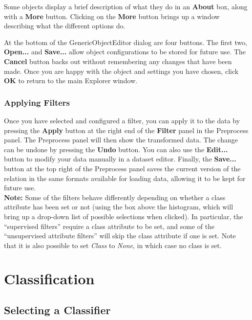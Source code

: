 \documentclass[a4paper]{article}
\begin{document}
Some objects display a brief description of what they do in an \textbf{About}
box, along with a \textbf{More} button. Clicking on the \textbf{More} button
brings up a window describing what the different options do.

At the bottom of the GenericObjectEditor dialog are four buttons. The first
two, \textbf{Open...} and \textbf{Save...} allow object configurations to be
stored for future use. The \textbf{Cancel} button backs out without remembering
any changes that have been made.  Once you are happy with the object and
settings you have chosen, click \textbf{OK} to return to the main Explorer
window.

\subsubsection*{Applying Filters}

Once you have selected and configured a filter, you can apply it to
the data by pressing the \textbf{Apply} button at the right end of the
\textbf{Filter} panel in the Preprocess panel. The Preprocess panel
will then show the transformed data. The change can be undone by
pressing the \textbf{Undo} button. You can also use the
\textbf{Edit...} button to modify your data manually in a dataset
editor.  Finally, the \textbf{Save...}  button at the top right of the
Preprocess panel saves the current version of the relation in the same
formats available for loading data, allowing it to be kept for future
use.  \\

\noindent \textbf{Note:} Some of the filters behave differently
depending on whether a class attribute has been set or not (using the
box above the histogram, which will bring up a drop-down list of
possible selections when clicked). In particular, the ``supervised
filters'' require a class attribute to be set, and some of the
``unsupervised attribute filters'' will skip the class attribute if
one is set. Note that it is also possible to set {\em Class} to {\em
None}, in which case no class is set.

\section{Classification}

\subsection{Selecting a Classifier}
\end{document}

